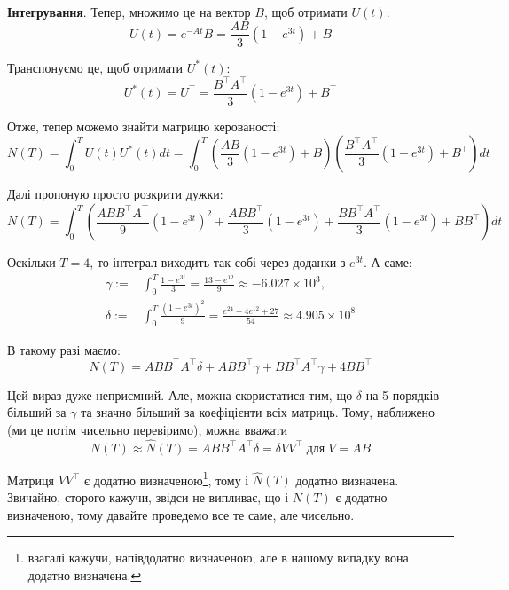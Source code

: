 \documentclass{hw_template}
\begin{document}
\textbf{Інтегрування}. Тепер, множимо це на вектор $B$, щоб отримати $U(t)$:
\begin{equation*}
    U(t) = e^{-At}B = \frac{AB}{3}(1-e^{3t}) + B
\end{equation*}

Транспонуємо це, щоб отримати $U^*(t)$:
\begin{equation*}
    U^*(t) = U^{\top} = \frac{B^{\top}A^{\top}}{3}(1-e^{3t}) + B^{\top}
\end{equation*}

Отже, тепер можемо знайти матрицю керованості:
\begin{equation*}
    N(T) = \int_0^T U(t)U^*(t)dt = \int_0^T \left(\frac{AB}{3}(1-e^{3t}) + B\right)\left(\frac{B^{\top}A^{\top}}{3}(1-e^{3t}) + B^{\top}\right)dt
\end{equation*}

Далі пропоную просто розкрити дужки:
\begin{equation*}
    N(T) = \int_0^T \left(\frac{ABB^{\top}A^{\top}}{9}(1-e^{3t})^2 + \frac{ABB^{\top}}{3}(1-e^{3t}) + \frac{BB^{\top}A^{\top}}{3}(1-e^{3t}) + BB^{\top}\right)dt
\end{equation*}

Оскільки $T=4$, то інтеграл виходить так собі через доданки з $e^{3t}$. А саме:
\begin{align*}
    \gamma := & \int_0^T \frac{1-e^{3t}}{3} = \frac{13-e^{12}}{9} \approx -6.027 \times 10^3, \\
    \delta := & \int_0^{T} \frac{(1-e^{3t})^2}{9} = \frac{e^{24}-4e^{12}+27}{54} \approx 4.905 \times 10^8
\end{align*}

В такому разі маємо:
\begin{equation*}
    N(T) = ABB^{\top}A^{\top}\delta + ABB^{\top}\gamma + BB^{\top}A^{\top}\gamma + 4BB^{\top}
\end{equation*}

Цей вираз дуже неприємний. Але, можна скористатися тим, що $\delta$ на 5 порядків більший за $\gamma$ та значно більший за коефіцієнти всіх матриць. Тому, наближено (ми це потім чисельно перевіримо), можна вважати
\begin{equation*}
    N(T) \approx \hat{N}(T) = ABB^{\top}A^{\top}\delta = \delta VV^{\top} \; \text{для} \; V = AB
\end{equation*}

Матриця $VV^{\top}$ є додатно визначеною\footnote{взагалі кажучи, напівдодатно визначеною, але в нашому випадку вона додатно визначена.}, тому і $\hat{N}(T)$ додатно визначена. Звичайно, сторого кажучи, звідси не випливає, що і $N(T)$ є додатно визначеною, тому давайте проведемо все те саме, але чисельно.
\end{document}
